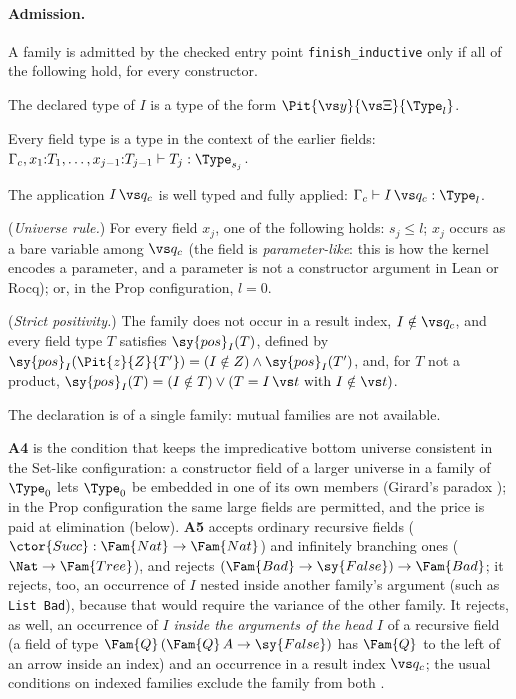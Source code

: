 \paragraph{Admission.}
A family is admitted by the checked entry point \texttt{finish\_inductive} only if all of the following hold, for every constructor.
\begin{description}[style=nextline,leftmargin=1.2em,itemsep=0.3em]
\item[A1] The declared type of $I$ is a type of the form $\Pit{\vs y}{\vs\Xi}{\Type_l}$.
\item[A2] Every field type is a type in the context of the earlier fields: $\Gamma_c, x_1{:}T_1,\dots,x_{j-1}{:}T_{j-1} \vdash T_j : \Type_{s_j}$.
\item[A3] The application $I\,\vs q_c$ is well typed and fully applied: $\Gamma_c \vdash I\,\vs q_c : \Type_l$.
\item[A4] (\emph{Universe rule.}) For every field $x_j$, one of the following holds:
  $s_j \le l$;
  $x_j$ occurs as a bare variable among $\vs q_c$ (the field is \emph{parameter-like}: this is how the kernel encodes a parameter, and a parameter is not a constructor argument in Lean or Rocq);
  or, in the Prop configuration, $l=0$.
\item[A5] (\emph{Strict positivity.}) The family does not occur in a result index, $I\notin\vs q_c$, and every field type $T$ satisfies $\sy{pos}_I(T)$, defined by
  $\sy{pos}_I(\Pit{z}{Z}{T'}) = (I\notin Z)\wedge\sy{pos}_I(T')$, and, for $T$ not a product,
  $\sy{pos}_I(T) = (I\notin T)\vee(T = I\,\vs t \text{ with } I\notin\vs t)$.
\item[A6] The declaration is of a single family: mutual families are not available.
\end{description}
\textbf{A4} is the condition that keeps the impredicative bottom universe consistent in the Set-like configuration: a constructor field of a larger universe in a family of $\Type_0$ lets $\Type_0$ be embedded in one of its own members (Girard's paradox \citep{coquand86girard,hurkens95}); in the Prop configuration the same large fields are permitted, and the price is paid at elimination (below).
\textbf{A5} accepts ordinary recursive fields ($\ctor{Succ}:\Fam{Nat}\to\Fam{Nat}$) and infinitely branching ones ($\Nat\to\Fam{Tree}$), and rejects $(\Fam{Bad}\to\sy{False})\to\Fam{Bad}$; it rejects, too, an occurrence of $I$ nested inside another family's argument (such as \texttt{List Bad}), because that would require the variance of the other family.
It rejects, as well, an occurrence of $I$ \emph{inside the arguments of the head $I$} of a recursive field (a field of type $\Fam{Q}\,(\Fam{Q}\,A\to\sy{False})$ has $\Fam{Q}$ to the left of an arrow inside an index) and an occurrence in a result index $\vs q_c$; the usual conditions on indexed families exclude the family from both \citep{dybjer94,paulin93}.

